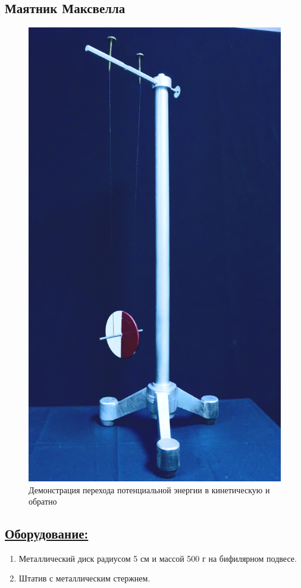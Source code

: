 \documentclass[14pt,a4paper,oneside]{extarticle}	%
\begin{document}
	
	
	\newpage
	\begin{center}
		\subsection*{Маятник Максвелла}
	\end{center}

\begin{figure}[H] 	
	\centering 	
	\includegraphics[width=0.5\linewidth]{Maxwell-1.png}
	\caption{Демонстрация перехода потенциальной энергии в кинетическую и обратно}
	\label{Maxwell-1}
\end{figure}

\subsection*{\underline{Оборудование:}}
\begin{enumerate}
	\item Металлический диск радиусом 5 см и массой 500 г на бифилярном подвесе.
	\item Штатив с металлическим стержнем.
\end{enumerate}
	
\end{document}
